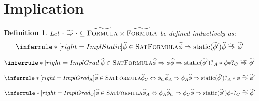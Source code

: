 \documentclass {article}
\newtheorem{definition}[theorem]{Definition}
\newcommand{\fphi}{\widehat{\phi}}
\newcommand{\tphi}{\widetilde{\phi}}
\newcommand{\imp}{\Rightarrow}
\newcommand{\timp}{\ \widetilde{\Rightarrow}\ }
\newcommand{\static}[1]{\textup{static}(#1)}
\newcommand{\satdef}{\textsc{SatFormula}}
\newcommand{\gradformula}{\widetilde{\textsc{Formula}}}
\begin{document}
\section{Implication}
\begin{definition}
\label{def_imp}
Let $\cdot \timp \cdot \subseteq \gradformula \times \gradformula$ be defined inductively as:\\
\[ \inferrule*[right=ImplStatic]
   {\fphi \in \satdef \\ \fphi \imp \static{\tphi'} }
   {\fphi \timp \tphi'}
\]

\[
\inferrule*[right=ImplGrad]
   {\fphi \in \satdef \\  \fphi \imp \phi\\ \fphi \imp \static{\tphi'}}
   {?_A \ast \phi \ast ?_C \timp \tphi'}
\]

\[
\inferrule*[right=ImplGrad\textsubscript{A}]
   {\fphi \in \satdef \\  \fphi_C \Leftrightarrow \phi_C\\ \fphi_A \Rightarrow \phi_A\\ \fphi \imp \static{\tphi'}}
   {?_A \ast \phi\timp \tphi'}
\]

\[
\inferrule*[right=ImplGrad\textsubscript{C}]
   {\fphi \in \satdef \\  \fphi_A \Leftrightarrow \phi_A\\ \fphi_C \Rightarrow \phi_C\\ \fphi \imp \static{\tphi'}}
   {\phi \ast ?_C \timp \tphi'}
\]
\end{definition}
\end{document}

